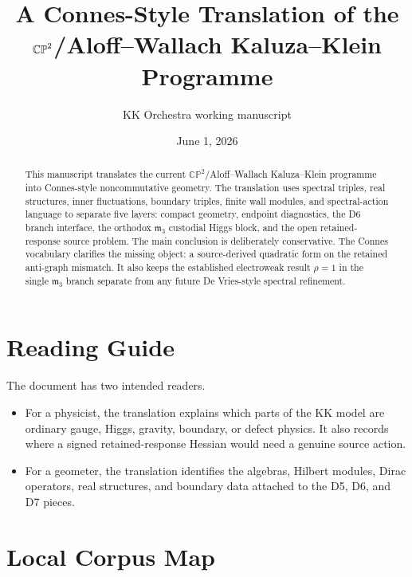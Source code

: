 \documentclass[11pt]{article}
\title{A Connes-Style Translation of the \texorpdfstring{$\CP^2$}{CP2}/Aloff--Wallach Kaluza--Klein Programme}
\author{KK Orchestra working manuscript}
\date{June 1, 2026}
\newcommand{\CP}{\mathbb{CP}}
\newcommand{\mthree}{\mathfrak m_3}
\begin{document}
\maketitle

\begin{abstract}
This manuscript translates the current \(\CP^2\)/Aloff--Wallach
Kaluza--Klein programme into Connes-style noncommutative geometry.  The
translation uses spectral triples, real structures, inner fluctuations,
boundary triples, finite wall modules, and spectral-action language to
separate five layers: compact geometry, endpoint diagnostics, the D6
branch interface, the orthodox \(\mthree\) custodial Higgs block, and the
open retained-response source problem.  The main conclusion is deliberately
conservative.  The Connes vocabulary clarifies the missing object: a
source-derived quadratic form on the retained anti-graph mismatch.  It also
keeps the established electroweak result \(\rho=1\) in the single
\(\mthree\) branch separate from any future De Vries-style spectral
refinement.
\end{abstract}

\tableofcontents

\section{Reading Guide}

The document has two intended readers.

\begin{itemize}[leftmargin=2em]
  \item For a physicist, the translation explains which parts of the KK
  model are ordinary gauge, Higgs, gravity, boundary, or defect physics.
  It also records where a signed retained-response Hessian would need a
  genuine source action.
  \item For a geometer, the translation identifies the algebras, Hilbert
  modules, Dirac operators, real structures, and boundary data attached to
  the D5, D6, and D7 pieces.
\end{itemize}

\section{Local Corpus Map}
\end{document}
